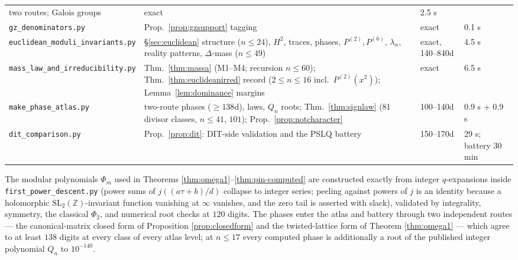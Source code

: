 \documentclass[11pt]{amsart}
\numberwithin{equation}{section}
\theoremstyle{plain}
\theoremstyle{definition}
\theoremstyle{remark}
\newcommand{\Z}{\mathbb{Z}}
\newcommand{\SL}{\mathrm{SL}}
\begin{document}
\begin{center}
\begin{tabular}{@{}p{4.1cm}p{5.6cm}p{1.35cm}p{1.0cm}@{}}
two routes; Galois groups & exact & 2.5 s\\
\texttt{gz\_denominators.py} & Prop.~\ref{prop:gzsupport} tagging &
exact & 0.1 s\\
\texttt{euclidean\_\allowbreak moduli\_\allowbreak invariants.py} & \S\ref{sec:euclidean}
structure ($n \le 24$), $H^2$, traces, phases, $P^{(2)}, P^{(6)}$,
$\lambda_n$, reality patterns, $\Delta$-mass ($n \le 49$) & exact,
140--840d & 4.5 s\\
\texttt{mass\_law\_\allowbreak and\_\allowbreak irreducibility.py} & Thm.~\ref{thm:massa}
(M1--M4; recursion $n \le 60$); Thm.~\ref{thm:euclideanirred} record
($2 \le n \le 16$ incl.\ $P^{(2)}(x^2)$); Lemma~\ref{lem:dominance}
margins & exact & 6.5 s\\
\texttt{make\_phase\_atlas.py} & two-route phases ($\ge 138$d), laws,
$Q_n$ roots; Thm.~\ref{thm:signlaw} (81 divisor classes, $n \le 41$,
$101$); Prop.~\ref{prop:notcharacter} & 100--140d & 0.9 s $+$ 0.9
s\\
\texttt{dit\_comparison.py} & Prop.~\ref{prop:dit}: DIT-side
validation and the PSLQ battery & 150--170d & 29 s; battery 30 min\\
\bottomrule
\end{tabular}
\end{center}

The modular polynomials $\Phi_m$ used in Theorems
\ref{thm:omega1}--\ref{thm:pin-computed} are constructed exactly from
integer $q$-expansions inside \texttt{first\_power\_descent.py}
(power sums of $j((a\tau + b)/d)$ collapse to integer series;
peeling against powers of $j$ is an identity because a holomorphic
$\SL_2(\Z)$-invariant function vanishing at $\infty$ vanishes, and
the zero tail is asserted with slack), validated by integrality,
symmetry, the classical $\Phi_2$, and numerical root checks at $120$
digits.  The phases enter the atlas and battery through two
independent routes --- the canonical-matrix closed form of Proposition
\ref{prop:closedform} and the twisted-lattice form of Theorem
\ref{thm:omega1} --- which agree to at least $138$ digits at every
class of every atlas level; at $n \le 17$ every computed phase is
additionally a root of the published integer polynomial $Q_n$ to
$10^{-140}$.

\end{document}
